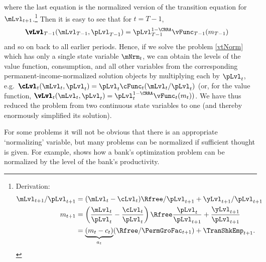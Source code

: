 \documentclass[titlepage, headings=optiontotocandhead]{\econtex}
\begin{document}
\unskip
where the last equation is the normalized version of the transition equation for $\mLvl_{t+1}$.\footnote{Derivation:
  \begin{equation*}\begin{gathered}\begin{aligned}
        \mLvl_{t+1}/\pLvl_{t+1}  & = (\mLvl_{t}-\cLvl_{t})\Rfree/\pLvl_{t+1} + {\yLvl}_{t+1}/\pLvl_{t+1}
        \\      {m}_{t+1}  & = \left(\frac{\mLvl_{t}}{\pLvl_{t}} - \frac{\cLvl_{t}}{\pLvl_{t}}\right)\Rfree\frac{\pLvl_{t}}{\pLvl_{t+1}} + \frac{{\yLvl}_{t+1}}{\pLvl_{t+1}}
        \\        & = \underbrace{({m}_{t} - {c}_{t})}_{{a}_{t}}(\Rfree/\PermGroFac_{t+1}) + \TranShkEmp_{t+1}.
      \end{aligned}\end{gathered}\end{equation*}
}  Then it is easy to see that for $t=T-1$,
\begin{equation*}\begin{gathered}\begin{aligned}
      {\pmb{\vLvl}}
_{T-1}(\mLvl_{T-1},\pLvl_{T-1})  & =  \pLvl_{T-1}^{1-\CRRA}\null{\vFunc}_{T-1}({m}_{T-1})
    \end{aligned}\end{gathered}\end{equation*}
and so on back to all earlier periods.  Hence, if we solve the problem \eqref{vtNorm}
which has only a single state variable $\mNrm_{t}$, we can obtain the levels of
the value function, consumption, and all other variables
from the corresponding permanent-income-normalized solution objects by multiplying each by $\pLvl_{t}$, e.g.\ ${\pmb{\cLvl}}
_{t}(\mLvl_{t},\pLvl_{t})=\pLvl_{t}\cFunc_{t}(\mLvl_{t}/\pLvl_{t})$ (or, for the value function, ${\pmb{\vLvl}}
_{t}({\mLvl}_{t},\pLvl_{t}) = \pLvl_{t}^{1-\CRRA}\vFunc_{t}({m}_{t}))$.  We have thus reduced the
problem from two continuous state variables to one (and thereby enormously simplified its solution).

For some problems it will not be obvious that there is an appropriate `normalizing' variable, but many problems can be normalized if sufficient thought is given.  For example, \cite{valencia:2006} shows how a bank's optimization problem can be normalized by the level of the bank's productivity.

\end{document}

